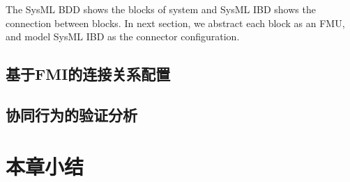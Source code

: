 \begin{figure}[htbp]
\end{figure}
The SysML BDD shows the blocks of system and SysML IBD shows the connection between blocks. In next section, we abstract each block as an FMU, and model SysML IBD as the connector configuration.
\subsection{基于FMI的连接关系配置} 

\subsection{协同行为的验证分析} 
\section{本章小结}

